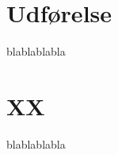 \documentclass{article}
\begin{document}
 
\newpage
\section{Udførelse}

blablablabla



\newpage
\section{XX}

blablablabla
\end{document}
